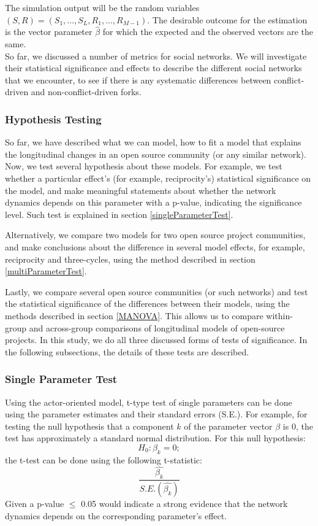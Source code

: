 \documentclass[12pt,letterpaper]{gthesis2}  %
\begin{document}
The simulation output will be the random variables $(S,R) = (S_1,...,S_L,R_1,...,R_{M-1})$. The desirable outcome for the estimation is the vector parameter $\hat{\beta}$ for which the expected and the observed vectors are the same. \\

So far, we discussed a number of metrics for social networks. We will investigate their statistical significance and effects to describe the different social networks that we encounter, to see if there is any systematic differences between conflict-driven and non-conflict-driven forks. 

\subsubsection*{Hypothesis Testing}
So far, we have described what we can model, how to fit a model that explains the longitudinal changes in an open source community (or any similar network). Now, we test several hypothesis about these models. For example, we test whether a particular effect's (for example, reciprocity's) statistical significance on the model, and make meaningful statements about whether the network dynamics depends on this parameter with a p-value, indicating the significance level. Such test is explained in section \ref{singleParameterTest}.

Alternatively, we compare two models for two open source project communities, and make conclusions about the difference in several model effects, for example, reciprocity and three-cycles, using the method described in section \ref{multiParameterTest}. 

Lastly, we compare several open source communities (or such networks) and test the statistical significance of the differences between their models, using the methods described in section \ref{MANOVA}. This allows us to compare within-group and across-group comparisons of longitudinal models of open-source projects. In this study, we do all three discussed forms of tests of significance. In the following subsections, the details of these tests are described.   

\subsubsection*{Single Parameter Test}
\label{singleParameterTest}
Using the actor-oriented model, t-type test of single parameters can be done using the parameter estimates and their standard errors (S.E.). 
For example, for testing the null hypothesis that a component $k$ of the parameter vector $\beta$ is 0, the test has approximately a standard normal distribution. For this null hypothesis: 
\begin{equation}
H_0: \beta_k = 0;
\end{equation}
the t-test can be done using the following t-statistic:
\begin{equation}
\frac{\hat{\beta_k}}{S.E.(\hat{\beta_k})}
\end{equation}
Given a p-value $\leq$ 0.05 would indicate a strong evidence that the network dynamics depends on the corresponding parameter's effect. 
\end{document}
